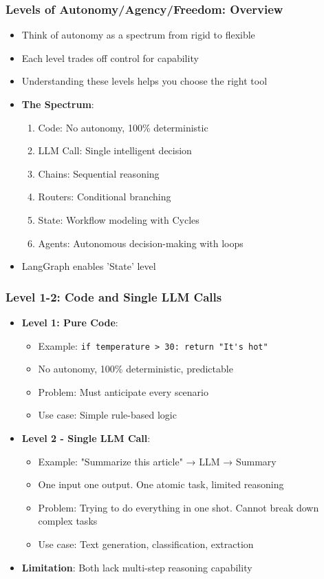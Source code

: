 \begin{frame}[fragile]\frametitle{Levels of Autonomy/Agency/Freedom: Overview}
      \begin{itemize}
        \item Think of autonomy as a spectrum from rigid to flexible
        \item Each level trades off control for capability
        \item Understanding these levels helps you choose the right tool
        \item \textbf{The Spectrum}:
        \begin{enumerate}
            \item Code: No autonomy, 100\% deterministic
            \item LLM Call: Single intelligent decision
            \item Chains: Sequential reasoning
            \item Routers: Conditional branching
			\item State: Workflow modeling with Cycles
            \item Agents: Autonomous decision-making with loops
        \end{enumerate}
        \item LangGraph enables 'State' level
      \end{itemize}
\end{frame}

\begin{frame}[fragile]\frametitle{Level 1-2: Code and Single LLM Calls}
      \begin{itemize}
        \item \textbf{Level 1: Pure Code}:
        \begin{itemize}
            \item Example: \lstinline|if temperature > 30: return "It's hot"| 
            \item No autonomy, 100\% deterministic, predictable
            \item Problem: Must anticipate every scenario
            \item Use case: Simple rule-based logic
        \end{itemize}
        \item \textbf{Level 2 - Single LLM Call}:
        \begin{itemize}
            \item Example: "Summarize this article" → LLM → Summary
            \item One input one output. One atomic task, limited reasoning
            \item Problem: Trying to do everything in one shot. Cannot break down complex tasks
            \item Use case: Text generation, classification, extraction
        \end{itemize}
        \item \textbf{Limitation}: Both lack multi-step reasoning capability
      \end{itemize}
\end{frame}

